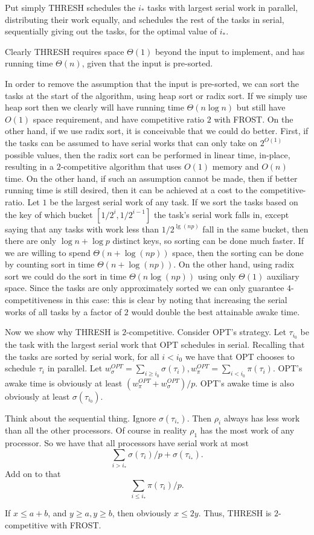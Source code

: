 Put simply THRESH schedules the $i_*$ tasks with largest serial
work in parallel, distributing their work equally, and schedules
the rest of the tasks in serial, sequentially giving out the
tasks, for the optimal value of $i_*$.

Clearly THRESH requires space $\Theta(1)$ beyond the input to
implement, and has running time $\Theta(n)$, given that the input
is pre-sorted.

In order to remove the assumption that the input is pre-sorted,
we can sort the tasks at the start of the algorithm, using heap
sort or radix sort. If we simply use heap sort then we clearly
will have running time $\Theta(n \log n)$ but still have $O(1)$
space requirement, and have competitive ratio $2$ with FROST.
On the other hand, if we use radix sort, it is conceivable that
we could do better. First, if the tasks can be assumed to have
serial works that can only take on $2^{O(1)}$ possible values,
then the radix sort can be performed in linear time, in-place,
resulting in a $2$-competitive algorithm that uses $O(1)$ memory
and $O(n)$ time. On the other hand, if such an assumption cannot
be made, then if better running time is still desired, then it
can be achieved at a cost to the competitive-ratio. Let $1$ be
the largest serial work of any task. If we sort the tasks based
on the key of which bucket $[1/2^i, 1/2^{i-1}]$ the task's
serial work falls in, except saying
that any tasks with work less than $1/2^{\lg (np)}$ fall in the
same bucket, then there are only $\log n + \log p$ distinct keys,
so sorting can be done much faster. If we are willing to spend
$\Theta(n + \log (np))$ space, then the sorting can be done by
counting sort in time $\Theta(n+\log(np))$. On the other hand,
using radix sort we could do the sort in time $\Theta(n \log
(np))$ using only $\Theta(1)$ auxiliary space. 
Since the tasks are only approximately sorted we can only
guarantee $4$-competitiveness in this case: this is clear by
noting that increasing the serial works of all tasks by a factor
of $2$ would double the best attainable awake time.

Now we show why THRESH is $2$-competitive.
Consider OPT's strategy.
Let $\tau_{i_0}$ be the task with the largest serial work that
OPT schedules in serial. Recalling that the tasks are sorted by
serial work, for all $i < i_0$ we have that OPT chooses to
schedule $\tau_i$ in parallel. Let $w^{OPT}_\sigma = \sum_{i \ge
i_0} \sigma(\tau_i), w^{OPT}_\pi = \sum_{i < i_0} \pi(\tau_i)$.
OPT's awake time is obviously at least $(w^{OPT}_\pi +
w^{OPT}_\sigma)/p$. OPT's awake time is also obviously at least
$\sigma(\tau_{i_0})$.

Think about the sequential thing.
Ignore $\sigma(\tau_{i_*})$. Then $\rho_i$ always has less work
than all the other processors. Of course in reality $\rho_1$ has
the most work of any processor.
So we have that all processors have serial work at most 
$$\sum_{i > i_*} \sigma(\tau_i)/p + \sigma(\tau_{i_*}).$$
Add on to that $$\sum_{i \le i_*} \pi(\tau_i)/p.$$

If $x \le a + b$, and $y \ge a, y \ge b$, then obviously $x \le
2y$. Thus, THRESH is $2$-competitive with FROST. 

